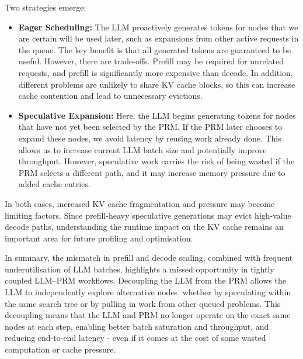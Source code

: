 \documentclass[12pt,twoside]{report}
\begin{document}
Two strategies emerge:
\begin{itemize}
  \item \textbf{Eager Scheduling:} The LLM proactively generates tokens for nodes that we are certain will be used later, such as expansions from other active requests in the queue. 
    The key benefit is that all generated tokens are guaranteed to be useful. 
    However, there are trade-offs. 
    Prefill may be required for unrelated requests, and prefill is significantly more expensive than decode. 
    In addition, different problems are unlikely to share KV cache blocks, so this can increase cache contention and lead to unnecessary evictions.
  \item \textbf{Speculative Expansion:} Here, the LLM begins generating tokens for nodes that have not yet been selected by the PRM. 
    If the PRM later chooses to expand these nodes, we avoid latency by reusing work already done. 
    This allows us to increase current LLM batch size and potentially improve throughput. 
    However, speculative work carries the risk of being wasted if the PRM selects a different path, and it may increase memory pressure due to added cache entries.
\end{itemize}

In both cases, increased KV cache fragmentation and pressure may become limiting factors. 
Since prefill-heavy speculative generations may evict high-value decode paths, understanding the runtime impact on the KV cache remains an important area for future profiling and optimisation.

In summary, the mismatch in prefill and decode scaling, combined with frequent underutilisation of LLM batches, highlights a missed opportunity in tightly coupled LLM–PRM workflows. 
Decoupling the LLM from the PRM allows the LLM to independently explore alternative nodes, whether by speculating within the same search tree or by pulling in work from other queued problems. 
This decoupling means that the LLM and PRM no longer operate on the exact same nodes at each step, enabling better batch saturation and throughput, and reducing end-to-end latency - even if it comes at the cost of some wasted computation or cache pressure.
\end{document}
